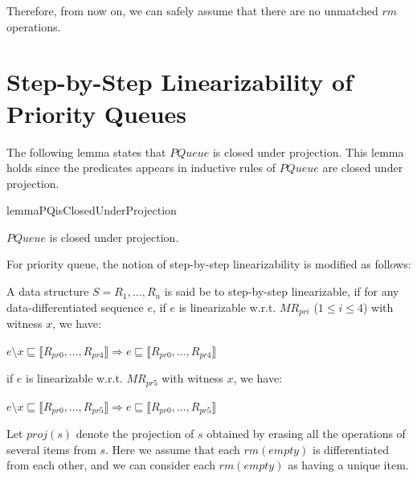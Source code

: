Therefore, from now on, we can safely assume that there are no unmatched $\textit{rm}$ operations.







\section{Step-by-Step Linearizability of Priority Queues}
\label{sec:step-by-step linearizability of priority queues}

The following lemma states that $\textit{PQueue}$ is closed under projection. This lemma holds since the predicates appears in inductive rules of $\textit{PQueue}$ are closed under projection.

\begin{restatable}{lemma}{PQisClosedUnderProjection}
\label{lemma:PQ is closed under projection}

$\textit{PQueue}$ is closed under projection.

\end{restatable}




For priority queue, the notion of step-by-step linearizability is modified as follows:

\begin{definition}\label{def:step-by-step linearizability of priority queue}
A data structure $S=R_1, \ldots, R_n$ is said be to step-by-step linearizable, if for any data-differentiated sequence $e$, if $e$ is linearizable w.r.t. $\textit{MR}_{\textit{pri}}$ ($1 \leq i \leq 4$) with witness $x$, we have:

$e \setminus x \sqsubseteq \llbracket R_{\textit{pr0}},\ldots,R_{\textit{pr4}} \rrbracket \Rightarrow e \sqsubseteq \llbracket R_{\textit{pr0}},\ldots,R_{\textit{pr4}} \rrbracket$

\noindent if $e$ is linearizable w.r.t. $\textit{MR}_{\textit{pr5}}$ with witness $x$, we have:

$e \setminus x \sqsubseteq \llbracket R_{\textit{pr0}},\ldots,R_{\textit{pr5}} \rrbracket \Rightarrow e \sqsubseteq \llbracket R_{\textit{pr0}},\ldots,R_{\textit{pr5}} \rrbracket$
\end{definition}

Let $\textit{proj}(s)$ denote the projection of $s$ obtained by erasing all the operations of several items from $s$. Here we assume that each $\textit{rm}(\textit{empty})$ is differentiated from each other, and we can consider each $\textit{rm}(\textit{empty})$ as having a unique item.


